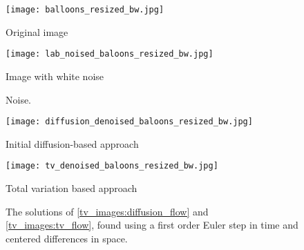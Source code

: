 %
%
%
\begin{figure}
\begin{minipage}[b]{.47\linewidth}
\centering
\texttt{[image: balloons\_resized\_bw.jpg]}
\caption*{Original image}
\end{minipage}
\hspace{0.5cm}
\begin{minipage}[b]{0.47\linewidth}
\centering
\texttt{[image: lab\_noised\_baloons\_resized\_bw.jpg]}
\caption*{Image with white noise}
\end{minipage}
\caption{Noise.}
\label{fig:noise_firstattempt}
\end{figure}

\begin{figure}
\begin{minipage}[b]{.47\linewidth}
\centering
\texttt{[image: diffusion\_denoised\_baloons\_resized\_bw.jpg]}
\caption*{Initial diffusion-based approach}
\end{minipage}
\hspace{0.5cm}
\begin{minipage}[b]{0.47\linewidth}
\centering
\texttt{[image: tv\_denoised\_baloons\_resized\_bw.jpg]}
\caption*{Total variation based approach}
\end{minipage}
\caption{The solutions of \eqref{tv_images:diffusion_flow} and \eqref{tv_images:tv_flow}, found using a first order Euler step in time and centered differences in space.}
\label{fig:noise_compare_attempts}
\end{figure}

